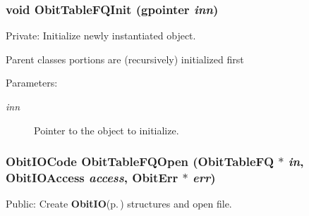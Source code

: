\subsubsection{\setlength{\rightskip}{0pt plus 5cm}void Obit\-Table\-FQInit (gpointer {\em inn})}\label{ObitTableFQ_8c_a8}


Private: Initialize newly instantiated object. 

Parent classes portions are (recursively) initialized first \begin{Desc}
\item[Parameters:]
\begin{description}
\item[{\em inn}]Pointer to the object to initialize. \end{description}
\end{Desc}
\subsubsection{\setlength{\rightskip}{0pt plus 5cm}Obit\-IOCode Obit\-Table\-FQOpen ({\bf Obit\-Table\-FQ} $\ast$ {\em in}, Obit\-IOAccess {\em access}, {\bf Obit\-Err} $\ast$ {\em err})}\label{ObitTableFQ_8c_a21}


Public: Create {\bf Obit\-IO}{\rm (p.\,\pageref{structObitIO})} structures and open file. 


